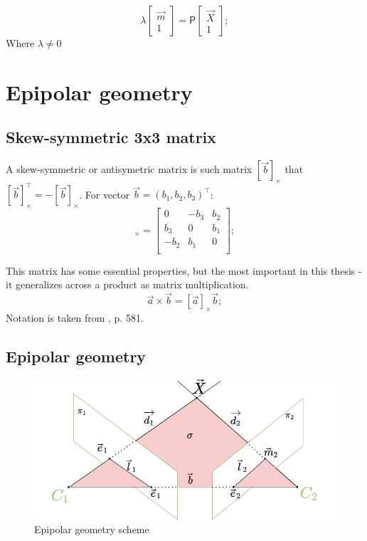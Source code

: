 \begin{equation}
    \lambda \begin{bmatrix} 
    \vec{m} \\ 1 \end{bmatrix} = \pmb{\mathsf{P}} \begin{bmatrix} \vec{X} \\ 1
\end{bmatrix};
\end{equation}
Where $\lambda \neq 0$

\section{Epipolar geometry}

\subsection{Skew-symmetric 3x3 matrix}
A skew-symmetric or antisymetric matrix is such matrix $[\vec{b}]_{\times}$ that $[\vec{b}]_{\times}^\top = -[\vec{b}]_{\times}$. 
For vector $\vec{b} = (b_1, b_2, b_3)^\top$:
\begin{equation}
    [\vec{b}]_{\times} = \begin{bmatrix}
        0 & -b_3 & b_2 \\ 
        b_3 & 0 & b_1 \\ 
        -b_2 & b_1 & 0 \\ 
    \end{bmatrix};
\end{equation}

This matrix has some essential properties, but the most important in this thesis - it generalizes across a product as matrix multiplication.
\begin{equation}
    \vec{a} \times \vec{b} = [\vec{a}]_{\times} \vec{b};
\end{equation}
Notation is taken from \cite{hartley_zisserman_2004}, p. 581.
\subsection{Epipolar geometry}
\begin{figure}[h]
    \centering
    \includegraphics[width=1\textwidth]{graphics/epipolar.png}
    \caption{Epipolar geometry scheme}
    \label{fig:epipolar_std}
\end{figure}


